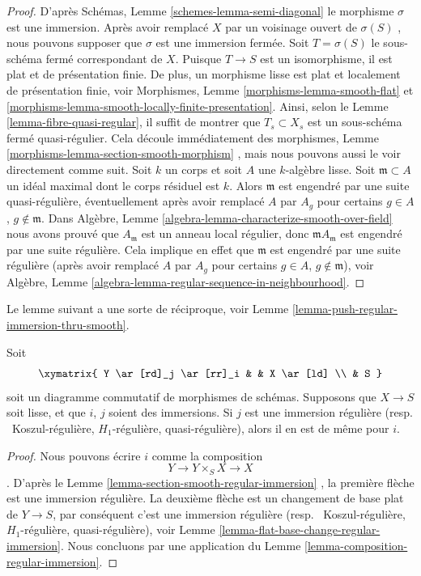 \begin{proof}
D'après Schémas, Lemme  \ref{schemes-lemma-semi-diagonal}  le morphisme  $\sigma$  est une immersion.
Après avoir remplacé  $X$  par un voisinage ouvert de  $\sigma(S)$ , nous
pouvons supposer que  $\sigma$  est une immersion fermée. Soit  $T = \sigma(S)$  le
sous-schéma fermé correspondant de  $X$. Puisque  $T \to S$  est un
isomorphisme, il est plat et de présentation finie. De plus, un morphisme lisse
est plat et localement de présentation finie, voir Morphismes, Lemme  \ref{morphisms-lemma-smooth-flat} 
et  \ref{morphisms-lemma-smooth-locally-finite-presentation}. Ainsi, selon le Lemme  \ref{lemma-fibre-quasi-regular}, il suffit de montrer que
 $T_s \subset X_s$  est un sous-schéma fermé quasi-régulier. Cela découle immédiatement
des morphismes, Lemme  \ref{morphisms-lemma-section-smooth-morphism} , mais nous pouvons aussi le voir directement
comme suit. Soit  $k$  un corps et soit  $A$  une
 $k$-algèbre lisse. Soit  $\mathfrak m \subset A$  un idéal maximal dont le corps
résiduel est  $k$. Alors  $\mathfrak m$  est engendré par une suite
quasi-régulière, éventuellement après avoir remplacé  $A$  par  $A_g$ 
pour certains  $g \in A$,  $g \not \in \mathfrak m$. Dans Algèbre, Lemme  \ref{algebra-lemma-characterize-smooth-over-field}  nous
avons prouvé que  $A_{\mathfrak m}$  est un anneau local régulier, donc  $\mathfrak mA_{\mathfrak m}$  est
engendré par une suite régulière. Cela implique en effet que  $\mathfrak m$  est
engendré par une suite régulière (après avoir remplacé  $A$  par
 $A_g$  pour certains  $g \in A$,  $g \not \in \mathfrak m$), voir Algèbre, Lemme
 \ref{algebra-lemma-regular-sequence-in-neighbourhood}.
\end{proof}

\noindent
Le lemme suivant a une sorte de réciproque, voir Lemme  \ref{lemma-push-regular-immersion-thru-smooth}.

\begin{lemma}
\label{lemma-lift-regular-immersion-to-smooth}
Soit
$$
\xymatrix{
Y \ar[rd]_j \ar[rr]_i & & X \ar[ld] \\
& S
}
$$
soit un diagramme commutatif de morphismes de schémas. Supposons que  $X \to S$ 
soit lisse, et que  $i$,  $j$  soient des immersions. Si
 $j$  est une immersion régulière (resp. \ Koszul-régulière,
 $H_1$-régulière, quasi-régulière), alors il en est de même pour
 $i$.
\end{lemma}

\begin{proof}
Nous pouvons écrire  $i$  comme la composition
$$
Y \to Y \times_S X \to X
$$
. D'après le Lemme  \ref{lemma-section-smooth-regular-immersion} , la première flèche est une immersion régulière.
La deuxième flèche est un changement de base plat de  $Y \to S$, par conséquent
c'est une immersion régulière (resp. \ Koszul-régulière,
 $H_1$-régulière, quasi-régulière), voir Lemme  \ref{lemma-flat-base-change-regular-immersion}. Nous concluons
par une application du Lemme  \ref{lemma-composition-regular-immersion}.
\end{proof}

